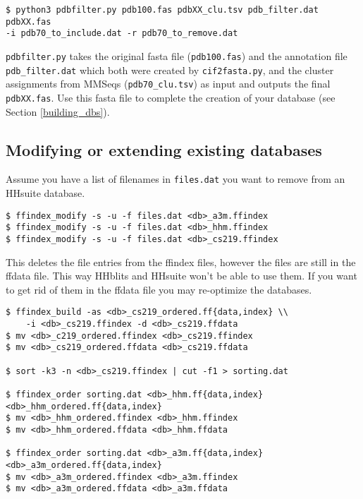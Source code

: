 \documentclass[11pt,a4paper]{article}
\begin{document}
\begin{verbatim}
$ python3 pdbfilter.py pdb100.fas pdbXX_clu.tsv pdb_filter.dat pdbXX.fas 
-i pdb70_to_include.dat -r pdb70_to_remove.dat
\end{verbatim}

\verb`pdbfilter.py` takes the original fasta file (\verb`pdb100.fas`) and the annotation file \verb`pdb_filter.dat` which both were created by \verb`cif2fasta.py`, and the cluster assignments from MMSeqs (\verb`pdb70_clu.tsv`) as input and outputs the final \verb`pdbXX.fas`. Use this fasta file to complete the creation of your database (see Section \ref{building_dbs}).

\subsection{Modifying or extending existing databases}

Assume you have a list of filenames in \verb`files.dat` you want to remove from an HHsuite database.

\begin{verbatim}
$ ffindex_modify -s -u -f files.dat <db>_a3m.ffindex
$ ffindex_modify -s -u -f files.dat <db>_hhm.ffindex
$ ffindex_modify -s -u -f files.dat <db>_cs219.ffindex
\end{verbatim}

This deletes the file entries from the ffindex files, however the files are still in the ffdata file.
This way HHblits and HHsuite won't be able to use them. If you want to get rid of them in the ffdata file
you may re-optimize the databases.

\begin{verbatim}
$ ffindex_build -as <db>_cs219_ordered.ff{data,index} \\
    -i <db>_cs219.ffindex -d <db>_cs219.ffdata
$ mv <db>_c219_ordered.ffindex <db>_cs219.ffindex
$ mv <db>_cs219_ordered.ffdata <db>_cs219.ffdata

$ sort -k3 -n <db>_cs219.ffindex | cut -f1 > sorting.dat

$ ffindex_order sorting.dat <db>_hhm.ff{data,index} <db>_hhm_ordered.ff{data,index}
$ mv <db>_hhm_ordered.ffindex <db>_hhm.ffindex
$ mv <db>_hhm_ordered.ffdata <db>_hhm.ffdata

$ ffindex_order sorting.dat <db>_a3m.ff{data,index} <db>_a3m_ordered.ff{data,index}
$ mv <db>_a3m_ordered.ffindex <db>_a3m.ffindex
$ mv <db>_a3m_ordered.ffdata <db>_a3m.ffdata
\end{verbatim}
\end{document}
